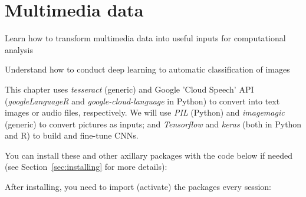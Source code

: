 \chapter{Multimedia data}
\label{chap:image}

\begin{abstract}{Abstract}
Digitally collected data often does not only contain texts, but also audio, images, and videos. Instead of using only textual features as we did in previous chapters, we could as well use, for instance, pixel values
to analyze images. First, we will see how to use existing libraries, commercial services or API's to conduct multimedia analysis (i.e., optical character recognition, speech-to-text or object recognition). Then we will show how to store, represent, and convert image data in order to use it as an input in our computational analysis.  We will focus on image analysis using machine learning classification techniques based on deep learning, and will explain how to build (or fine-tune) a Convolutional Neural Network (CNN) by ourselves.
\end{abstract}


\begin{objectives}
\item Learn how to transform multimedia data into useful inputs for computational analysis
\item Understand how to conduct deep learning to automatic classification of images
\end{objectives}

\begin{feature}
This chapter uses \emph{tesseract} (generic) and  Google 'Cloud Speech' API (\emph{googleLanguageR} and \emph{google-cloud-language} in Python) to convert into text images or audio files, respectively. We will use \emph{PIL} (Python) and \emph{imagemagic} (generic) to convert pictures as inputs; and \emph{Tensorflow} and \emph{keras} (both in Python and R) to build and fine-tune CNNs.

You can install these and other axillary packages with the code below if needed  (see Section~\ref{sec:installing} for more details):


\noindent After installing, you need to import (activate) the packages every session:


\end{feature}





